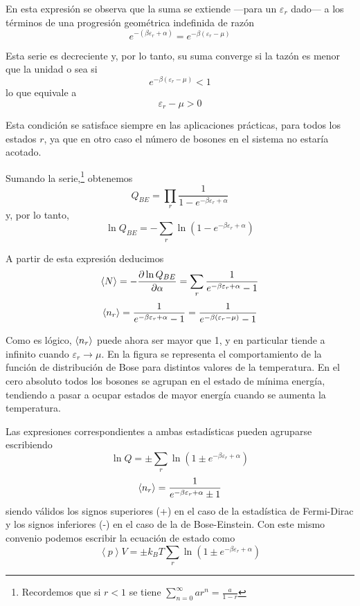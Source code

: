En esta expresión se observa que la suma se extiende ---para un $\varepsilon_r$ dado--- a los términos de una progresión geométrica indefinida de razón
$$e^{-(\beta\varepsilon_r + \alpha)} = e^{-\beta(\varepsilon_r - \mu)}$$
	
Esta serie es decreciente y, por lo tanto, su suma converge si la tazón es menor que la unidad o sea si
$$e^{-\beta(\varepsilon_r - \mu)} < 1$$
lo que equivale a
\begin{equation}\label{eq:cond_FD}
	\varepsilon_r - \mu > 0
\end{equation}

Esta condición se satisface siempre en las aplicaciones prácticas, para todos los estados $r$, ya que en otro caso el número de bosones en el sistema no estaría acotado.

Sumando la serie,\footnote{Recordemos que si $r < 1$ se tiene $\sum_{n=0}^{\infty} ar^n = \frac{a}{1-r}$} obtenemos
\begin{equation}
	Q_{BE} = \prod_r \frac{1}{1 - e^{-\beta\varepsilon_r + \alpha}}
\end{equation}
y, por lo tanto,
\begin{equation}
	\ln Q_{BE} = - \sum_r \ln (1 - e^{-\beta\varepsilon_r + \alpha})
\end{equation}

A partir de esta expresión deducimos
\begin{equation}
	\expval{N} = - \frac{\partial \ln Q_{BE}}{\partial \alpha} = \sum_r \frac{1}{e^{-\beta\varepsilon_r + \alpha} - 1}
\end{equation}
\begin{equation}
	\expval{n_r} = \frac{1}{e^{-\beta\varepsilon_r + \alpha} - 1} = \frac{1}{e^{-\beta(\varepsilon_r - \mu)} - 1}
\end{equation}

Como es lógico, $\expval{n_r}$ puede ahora ser mayor que 1, y en particular tiende a infinito cuando $\varepsilon_r \rightarrow \mu$.
En la figura se representa el comportamiento de la función de distribución de Bose para distintos valores de la temperatura.
En el cero absoluto todos los bosones se agrupan en el estado de mínima energía, tendiendo a pasar a ocupar estados de mayor energía cuando se aumenta la temperatura.

Las expresiones correspondientes a ambas estadísticas pueden agruparse escribiendo
\begin{equation}
	\ln Q = \pm \sum_r 	\ln (1 \pm e^{-\beta\varepsilon_r + \alpha})
\end{equation}
\begin{equation}\label{eq:n_e_BE}
	\expval{n_r} = \frac{1}{e^{-\beta\varepsilon_r + \alpha} \pm 1}
\end{equation}
siendo válidos los signos superiores (+) en el caso de la estadística de Fermi-Dirac y
los signos inferiores (-) en el caso de la de Bose-Einstein.
Con este mismo convenio podemos escribir la ecuación de estado como
\begin{equation}
	\left\langle p \right\rangle V = \pm k_B T \sum_r \ln (1 \pm e^{-\beta\varepsilon_r + \alpha})
\end{equation}

